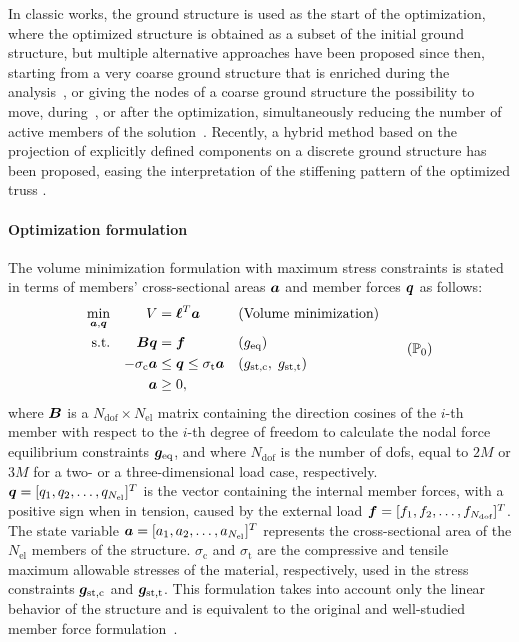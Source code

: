 In classic works, the ground structure is used as the start of the optimization, where the optimized structure is obtained as a subset of the initial ground structure, but multiple alternative approaches have been proposed since then, \eg starting from a very coarse ground structure that is enriched during the analysis~, or giving the nodes of a coarse ground structure the possibility to move, during~, or after the optimization, simultaneously reducing the number of active members of the solution~. Recently, a hybrid method based on the projection of explicitly defined components on a discrete ground structure has been proposed, easing the interpretation of the stiffening pattern of the optimized truss .

\paragraph{Optimization formulation}
The volume minimization formulation with maximum stress constraints is stated in terms of members' cross-sectional areas $\bm{a}$ and member forces $\bm{q}$ as follows:
\begin{equation}
    \begin{aligned}
    \min_{\vect{a}, \vect{q}}   && V &= \vect{\ell}^{T}\vect{a} && \textrm{(Volume minimization)}\\
    \textrm{s.t.}   && \matr{B}\vect{q} &= \vect{f} && (g_\text{eq})\\
    && -\sigma_\text{c}\vect{a} &\leq \vect{q} \leq \sigma_\text{t}\vect{a} && (g_\text{st,c}, \; g_\text{st,t}) \\
    && \vect{a} &\geq 0, \\
    \end{aligned}
    \tag{$\mathbb{P}_0$}
    \label{eq:02_optim_original}
\end{equation}
where $\bm{B}$ is a $N_{\text{dof}} \times N_{\text{el}}$ matrix containing the direction cosines of the $i$-th member with respect to the $i$-th degree of freedom to calculate the nodal force equilibrium constraints $\bm{g}_\text{eq}$, and where $N_{\text{dof}}$ is the number of \gls{dofs}, equal to $2M$ or $3M$ for a two- or a three-dimensional load case, respectively. $\bm{q} = [q_1, q_2, \ldots,q_{N_{\text{el}}}]^T$ is the vector containing the internal member forces, with a positive sign when in tension, caused by the external load $\bm{f} = [f_1, f_2, \ldots,f_{N_{\text{dof}}}]^T$. The state variable $\bm{a} = [a_1, a_2, \ldots,a_{N_{\text{el}}}]^T$ represents the cross-sectional area of the $N_{\text{el}}$ members of the structure. $\sigma_\text{c}$ and $\sigma_\text{t}$ are the compressive and tensile maximum allowable stresses of the material, respectively, used in the stress constraints $\bm{g}_\text{st,c}$ and $\bm{g}_\text{st,t}$. This formulation takes into account only the linear behavior of the structure and is equivalent to the original and well-studied member force formulation~.

